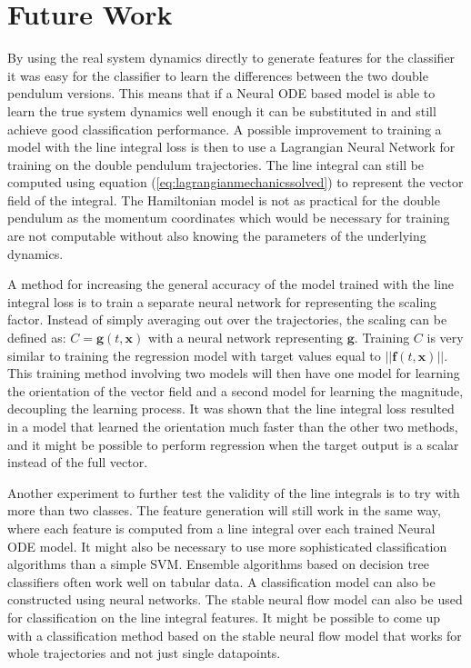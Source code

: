 \documentclass[12pt,a4paper]{book}
\begin{document}
\section{Future Work}
\label{sec:futureWork}

By using the real system dynamics directly to generate features for the classifier it was easy for the classifier to learn the differences between the two double pendulum versions. This means that if a Neural ODE based model is able to learn the true system dynamics well enough it can be substituted in and still achieve good classification performance. A possible improvement to training a model with the line integral loss is then to use a Lagrangian Neural Network for training on the double pendulum trajectories. The line integral can still be computed using equation (\ref{eq:lagrangianmechanicssolved}) to represent the vector field of the integral. The Hamiltonian model is not as practical for the double pendulum as the momentum coordinates which would be necessary for training are not computable without also knowing the parameters of the underlying dynamics.

A method for increasing the general accuracy of the model trained with the line integral loss is to train a separate neural network for representing the scaling factor. Instead of simply averaging out over the trajectories, the scaling can be defined as: $C = \bm{g}(t, \bm{x})$ with a neural network representing $\bm{g}$. Training $C$ is very similar to training the regression model with target values equal to $|| \bm{f}(t, \bm{x}) ||$. This training method involving two models will then have one model for learning the orientation of the vector field and a second model for learning the magnitude, decoupling the learning process. It was shown that the line integral loss resulted in a model that learned the orientation much faster than the other two methods, and it might be possible to perform regression when the target output is a scalar instead of the full vector.

Another experiment to further test the validity of the line integrals is to try with more than two classes. The feature generation will still work in the same way, where each feature is computed from a line integral over each trained Neural ODE model. It might also be necessary to use more sophisticated classification algorithms than a simple SVM. Ensemble algorithms based on decision tree classifiers often work well on tabular data. A classification model can also be constructed using neural networks. The stable neural flow model can also be used for classification on the line integral features. It might be possible to come up with a classification method based on the stable neural flow model that works for whole trajectories and not just single datapoints.
\end{document}
